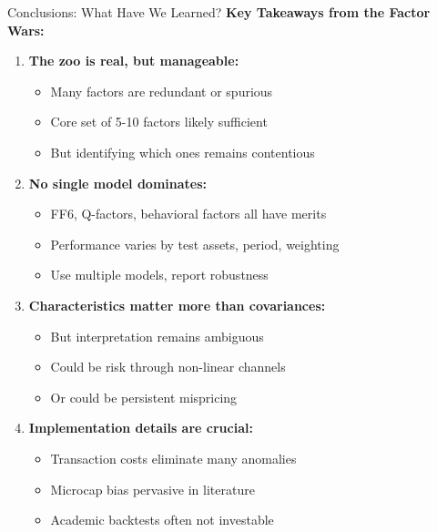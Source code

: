\documentclass{beamer}
\begin{document}
\begin{frame}{Conclusions: What Have We Learned?}
    \textbf{Key Takeaways from the Factor Wars:}
    
    
    \begin{enumerate}
        \item \textbf{The zoo is real, but manageable:}
        \begin{itemize}
            \item Many factors are redundant or spurious
            \item Core set of 5-10 factors likely sufficient
            \item But identifying which ones remains contentious
        \end{itemize}
        
        \item \textbf{No single model dominates:}
        \begin{itemize}
            \item FF6, Q-factors, behavioral factors all have merits
            \item Performance varies by test assets, period, weighting
            \item Use multiple models, report robustness
        \end{itemize}
        
        \item \textbf{Characteristics matter more than covariances:}
        \begin{itemize}
            \item But interpretation remains ambiguous
            \item Could be risk through non-linear channels
            \item Or could be persistent mispricing
        \end{itemize}
        
        \item \textbf{Implementation details are crucial:}
        \begin{itemize}
            \item Transaction costs eliminate many anomalies
            \item Microcap bias pervasive in literature
            \item Academic backtests often not investable
        \end{itemize}
    \end{enumerate}
\end{frame}
\end{document}
